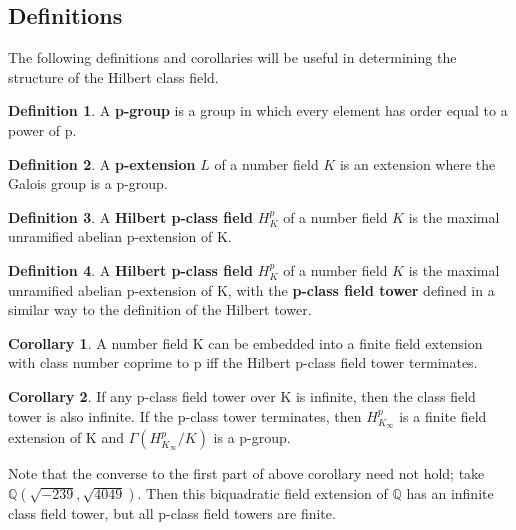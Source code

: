\documentclass[12pt]{extarticle}
\newcommand{\<}{\langle}
\renewcommand{\>}{\rangle}
\theoremstyle{definition}
\newtheorem{corollary}{Corollary}
\newtheorem*{definition}{Definition}
\begin{document}
\subsection{Definitions}
The following definitions and corollaries will be useful in determining the structure of the Hilbert class field. 
\begin{definition}
A \textbf{p-group} is a group in which every element has order equal to a power of p.
\end{definition}
\begin{definition}
A \textbf{p-extension} $L$ of a number field $K$ is an extension where the Galois group is a p-group.
\end{definition}
\begin{definition}
A \textbf{Hilbert p-class field} $H_K^{p}$ of a number field $K$ is the maximal unramified abelian p-extension of K.
\end{definition}
\begin{definition}
A \textbf{Hilbert p-class field} $H_K^{p}$ of a number field $K$ is the maximal unramified abelian p-extension of K, with the \textbf{p-class field tower} defined in a similar way to the definition of the Hilbert tower. 
\end{definition}
\begin{corollary}
 A number field K can be embedded into a finite field extension with class number coprime to p iff the Hilbert p-class field tower terminates.
\end{corollary}
\begin{corollary}
If any p-class field tower over K is infinite, then the class field tower is also infinite. If the p-class tower terminates, then $H_{K_\infty}^{p}$ is a finite field extension of K and $\Gamma(H_{K_\infty}^{p}/K)$ is a p-group.
\end{corollary}
Note that the converse to the first part of above corollary need not hold; take $\mathbb{Q}\left(\sqrt{-239},\sqrt{4049}\right)$. Then this biquadratic field extension of $\mathbb{Q}$ has an infinite class field tower, but all p-class field towers are finite. 
\end{document}
